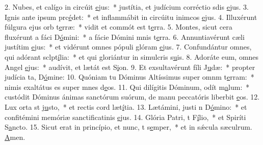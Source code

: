 2. Nubes, et calígo in circúit \uline{e}jus:~* justítia, et judícium corréctio sdis \uline{e}jus.
3. Ignis ante ipsum prc\uline{é}det:~* et inflammábit in circúitu inimcos \uline{e}jus.
4. Illuxérunt fúlgura ejus orb t\uline{e}rræ:~* vidit et commót est t\uline{e}rra.
5. Montes, sicut cera fluxérunt a fáci D\uline{ó}mini:~* a fácie Dómini mnis t\uline{e}rra.
6. Annuntiavérunt cæli justítim \uline{e}jus:~* et vidérunt omnes pópuli glóram \uline{e}jus.
7. Confundántur omnes, qui adórant sclpt\uline{í}lia:~* et qui gloriántur in simulcris s\uline{u}is.
8. Adoráte eum, omnes Angel \uline{e}jus:~* audívit, et lætát est S\uline{i}on.
9. Et exsultavérunt fíli J\uline{u}dæ:~* propter judícia ta, D\uline{ó}mine:
10. Quóniam tu Dóminus Altíssimus super omnm t\uline{e}rram:~* nimis exaltátus es super mnes d\uline{e}os.
11. Qui dilígitis Dóminum, odít m\uline{a}lum:~* custódit Dóminus ánimas sanctórum suórum, de manu peccatóris liberbit \uline{e}os.
12. Lux orta st j\uline{u}sto,~* et rectis cord læt\uline{í}tia.
13. Lætámini, justi n D\uline{ó}mino:~* et confitémini memóriæ sanctificatinis \uline{e}jus.
14. Glória Patri, t F\uline{í}lio,~* et Spiríti S\uline{a}ncto.
15. Sicut erat in princípio, et nunc, t s\uline{e}mper,~* et in sǽcula sæculrum. \uline{A}men.

